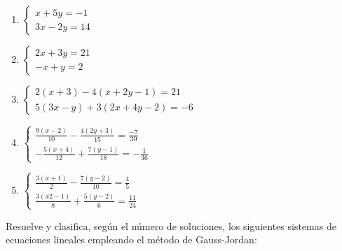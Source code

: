 \begin{enumerate}[topsep=0pt]
	\item $\begin{cases}
			x+5y = -1 \\
			3x-2y = 14
			\end{cases}$
	\item $\begin{cases}
			2x+3y = 21 \\
			-x + y = 2
			\end{cases}$
	\item $\begin{cases}
			2(x+3) - 4(x+2y-1) = 21 \\
			5(3x-y) + 3(2x+4y-2) = -6
		   \end{cases}$
	\item $\begin{cases}
			\frac{9(x-2)}{10} - \frac{4(2y + 3)}{15} = \frac{-7}{30} \\
			-\frac{5(x+4)}{12} + \frac{7(y-1)}{18} = -\frac{1}{36}
		   \end{cases} $
	\item $\begin{cases}
			\frac{3(x+1)}{2} - \frac{7(y-2)}{10} = \frac{4}{5} \\
			\frac{3(x2-1)}{8} + \frac{5(y-2)}{6} = \frac{11}{24}
		   \end{cases}$
\end{enumerate}


\Exercicio Resuelve y clasifica, según el número de soluciones, los siguientes sistemas de ecuaciones lineales empleando el método de Gauss-Jordan:

